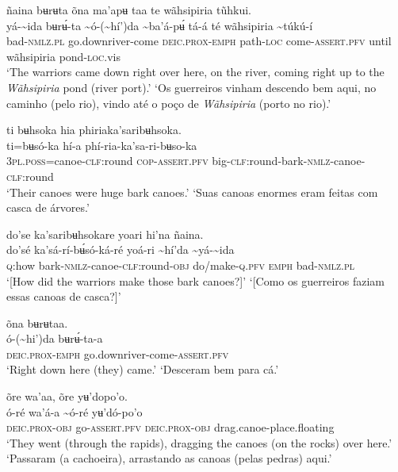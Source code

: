 \documentclass[output=paper,
modfonts,nonflat
]{langsci/langscibook}
\begin{document}
 
\ea ñaina bʉrʉta õna ma'apʉ taa te wãhsipiria tũhkui. \\[.3em]
\gll {\textasciitilde}yá-{\textasciitilde}ida	bʉrʉ́-ta	{\textasciitilde}ó-({\textasciitilde}hí')da	{\textasciitilde}ba'á-pʉ́	tá-á té	wãhsipiria	{\textasciitilde}túkú-í\\
     bad\textsc{-nmlz.pl}	go.downriver-come	\textsc{deic.prox-emph}	path\textsc{-loc}	come-\textsc{assert.pfv} until	wãhsipiria	pond\textsc{-loc}.vis\\
\glt ‘The warriors came down right over here, on the river, coming right up to the \textit{Wãhsipiria} pond (river port).’
\glt ‘Os guerreiros vinham descendo bem aqui, no caminho (pelo rio), vindo até o poço de \textit{Wãhsipiria} (porto no rio).’
\z 

\ea ti bʉhsoka hia phiriaka'saribʉhsoka. \\[.3em]
\gll ti=bʉsó-ka	hí-a	phí-ria-ka'sa-ri-bʉso-ka	 \\
     3\textsc{pl.poss}=canoe-\textsc{clf:}round	\textsc{cop-assert.pfv}	big-\textsc{clf:}round-bark\textsc{-nmlz}-canoe-\textsc{clf:}round	\\
\glt ‘Their canoes were huge bark canoes.’
\glt ‘Suas canoas enormes eram feitas com casca de árvores.’
\z 

\ea do'se ka'saribʉhsokare yoari hi’na ñaina. \\[.3em]
\gll do'sé	ka'sá-rí-bʉ́só-ká-ré	yoá{\footnotemark}-ri	{\textasciitilde}hí'da	{\textasciitilde}yá-{\textasciitilde}ida \\
     \textsc{q:}how	bark\textsc{-nmlz}-canoe-\textsc{clf:}round\textsc{-obj}	do/make-\textsc{q.pfv}	\textsc{emph}	bad\textsc{-nmlz.pl}\\
\glt ‘[How did the warriors make those bark canoes?]’
\glt ‘[Como os guerreiros faziam essas canoas de casca?]’ 
\z

\ea õna bʉrʉtaa.  \\[.3em]
\gll {\textasciitilde}ó-({\textasciitilde}hi')da	bʉrʉ́-ta-a \\
     \textsc{deic.prox-emph}	go.downriver-come-\textsc{assert.pfv}\\
\glt ‘Right down here (they) came.’
\glt ‘Desceram bem para cá.’
\z 

 
\ea õre wa'aa, õre yʉ'dopo'o. \\[.3em]
\gll {\textasciitilde}ó-ré	wa'á-a	{\textasciitilde}ó-ré	yʉ'dó-po'o \\
     \textsc{deic.prox-obj} 	go-\textsc{assert.pfv}	\textsc{deic.prox-obj} 	drag.canoe-place.floating\\
\glt ‘They went (through the rapids), dragging the canoes (on the rocks) over here.’{\footnotemark}
\glt ‘Passaram (a cachoeira), arrastando as canoas (pelas pedras) aqui.’
\z 
\end{document}
